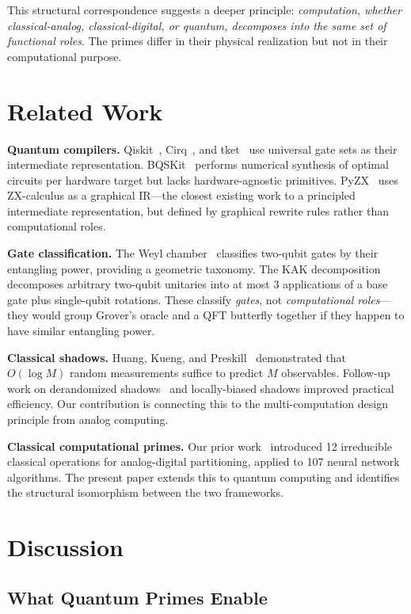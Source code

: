 \documentclass[11pt]{article}
\begin{document}
This structural correspondence suggests a deeper principle: \textit{computation, whether classical-analog, classical-digital, or quantum, decomposes into the same set of functional roles}. The primes differ in their physical realization but not in their computational purpose.

\section{Related Work}

\textbf{Quantum compilers.} Qiskit~\cite{qiskit}, Cirq~\cite{cirq}, and tket~\cite{tket} use universal gate sets as their intermediate representation. BQSKit~\cite{bqskit} performs numerical synthesis of optimal circuits per hardware target but lacks hardware-agnostic primitives. PyZX~\cite{pyzx} uses ZX-calculus as a graphical IR---the closest existing work to a principled intermediate representation, but defined by graphical rewrite rules rather than computational roles.

\textbf{Gate classification.} The Weyl chamber~\cite{weyl} classifies two-qubit gates by their entangling power, providing a geometric taxonomy. The KAK decomposition decomposes arbitrary two-qubit unitaries into at most 3 applications of a base gate plus single-qubit rotations. These classify \textit{gates}, not \textit{computational roles}---they would group Grover's oracle and a QFT butterfly together if they happen to have similar entangling power.

\textbf{Classical shadows.} Huang, Kueng, and Preskill~\cite{shadows} demonstrated that $O(\log M)$ random measurements suffice to predict $M$ observables. Follow-up work on derandomized shadows~\cite{derandomized} and locally-biased shadows improved practical efficiency. Our contribution is connecting this to the multi-computation design principle from analog computing.

\textbf{Classical computational primes.} Our prior work~\cite{bieg_primes} introduced 12 irreducible classical operations for analog-digital partitioning, applied to 107 neural network algorithms. The present paper extends this to quantum computing and identifies the structural isomorphism between the two frameworks.

\section{Discussion}

\subsection{What Quantum Primes Enable}
\end{document}
